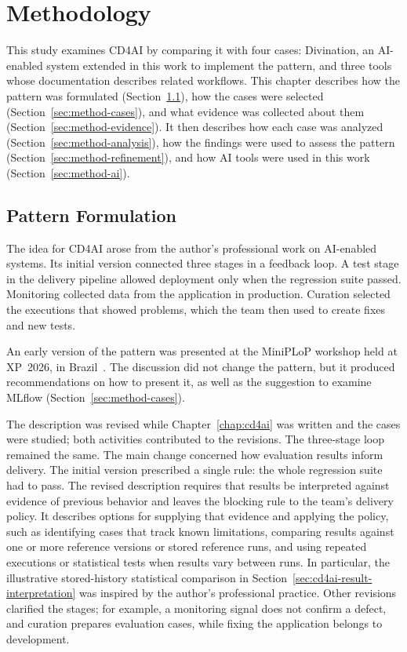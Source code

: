 \chapter{Methodology}
\label{chap:methodology}

This study examines CD4AI by comparing it with four cases: Divination, an
AI-enabled system extended in this work to implement the pattern, and three
tools whose documentation describes related workflows. This chapter describes
how the pattern was formulated (Section~\ref{sec:method-pattern}), how the
cases were selected (Section~\ref{sec:method-cases}), and what evidence was
collected about them (Section~\ref{sec:method-evidence}). It then describes
how each case was analyzed (Section~\ref{sec:method-analysis}), how the
findings were used to assess the pattern (Section~\ref{sec:method-refinement}),
and how AI tools were used in this work (Section~\ref{sec:method-ai}).

\section{Pattern Formulation}
\label{sec:method-pattern}

The idea for CD4AI arose from the author's professional work on AI-enabled
systems. Its initial version connected three stages in a feedback loop. A test
stage in the delivery pipeline allowed deployment only when the regression
suite passed. Monitoring collected data from the application in production.
Curation selected the executions that showed problems, which the team then
used to create fixes and new tests.

An early version of the pattern was presented at the MiniPLoP workshop held at
XP~2026, in Brazil~\parencite{Iasco:CD4AI:2026}. The discussion did not change
the pattern, but it produced recommendations on how to present it, as well as
the suggestion to examine MLflow (Section~\ref{sec:method-cases}).

The description was revised while Chapter~\ref{chap:cd4ai} was written and the
cases were studied; both activities contributed to the revisions. The
three-stage loop remained the same. The main change concerned how evaluation
results inform delivery. The initial version prescribed a single rule: the
whole regression suite had to pass. The revised description requires that
results be interpreted against evidence of previous behavior and leaves the
blocking rule to the team's delivery policy. It describes options for supplying
that evidence and applying the policy, such as identifying cases that track
known limitations, comparing results against one or more reference versions or
stored reference runs, and using repeated executions or statistical tests when
results vary between runs. In particular, the illustrative stored-history
statistical comparison in Section~\ref{sec:cd4ai-result-interpretation} was
inspired by the author's professional practice. Other revisions clarified the
stages; for example, a monitoring signal does not confirm a defect, and curation
prepares evaluation cases, while fixing the application belongs to development.

